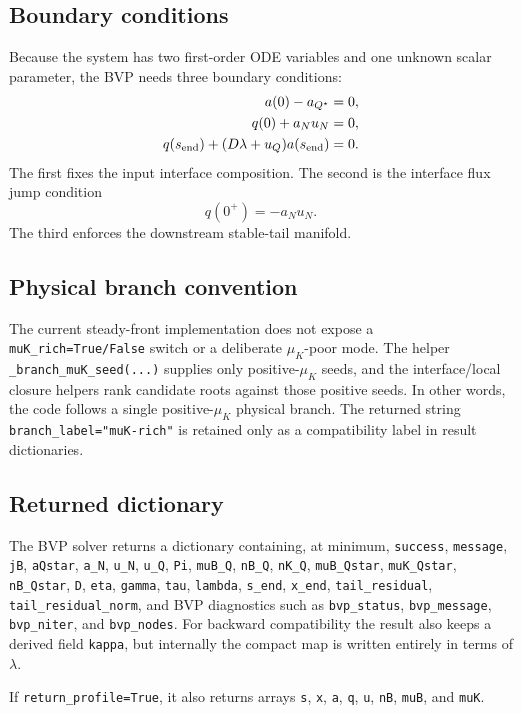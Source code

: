 \documentclass[11pt]{article}
\begin{document}
\subsection{Boundary conditions}
Because the system has two first-order ODE variables and one unknown scalar
parameter, the BVP needs three boundary conditions:
\begin{align}
a(0)-a_{Q^\star} &= 0,\\
q(0)+a_Nu_N &= 0,\\
q(s_{\rm end})+(D\lambda+u_Q)a(s_{\rm end}) &= 0.
\end{align}
The first fixes the input interface composition. The second is the interface
flux jump condition
\[
q(0^+)=-a_Nu_N.
\]
The third enforces the downstream stable-tail manifold.

\subsection{Physical branch convention}
The current steady-front implementation does not expose a
\texttt{muK\_rich=True/False} switch or a deliberate $\mu_K$-poor mode. The
helper \texttt{\_branch\_muK\_seed(...)} supplies only positive-$\mu_K$ seeds,
and the interface/local closure helpers rank candidate roots against those
positive seeds. In other words, the code follows a single positive-$\mu_K$
physical branch. The returned string \texttt{branch\_label="muK-rich"} is
retained only as a compatibility label in result dictionaries.

\subsection{Returned dictionary}
The BVP solver returns a dictionary containing, at minimum,
\texttt{success}, \texttt{message}, \texttt{jB}, \texttt{aQstar},
\texttt{a\_N}, \texttt{u\_N}, \texttt{u\_Q}, \texttt{Pi},
\texttt{muB\_Q}, \texttt{nB\_Q}, \texttt{nK\_Q}, \texttt{muB\_Qstar},
\texttt{muK\_Qstar}, \texttt{nB\_Qstar}, \texttt{D}, \texttt{eta},
\texttt{gamma}, \texttt{tau}, \texttt{lambda},
\texttt{s\_end}, \texttt{x\_end}, \texttt{tail\_residual},
\texttt{tail\_residual\_norm}, and BVP diagnostics such as
\texttt{bvp\_status}, \texttt{bvp\_message}, \texttt{bvp\_niter}, and
\texttt{bvp\_nodes}. For backward compatibility the result also keeps a
derived field \texttt{kappa}, but internally the compact map is written
entirely in terms of $\lambda$.

If \texttt{return\_profile=True}, it also returns arrays
\texttt{s}, \texttt{x}, \texttt{a}, \texttt{q}, \texttt{u}, \texttt{nB},
\texttt{muB}, and \texttt{muK}.
\end{document}
